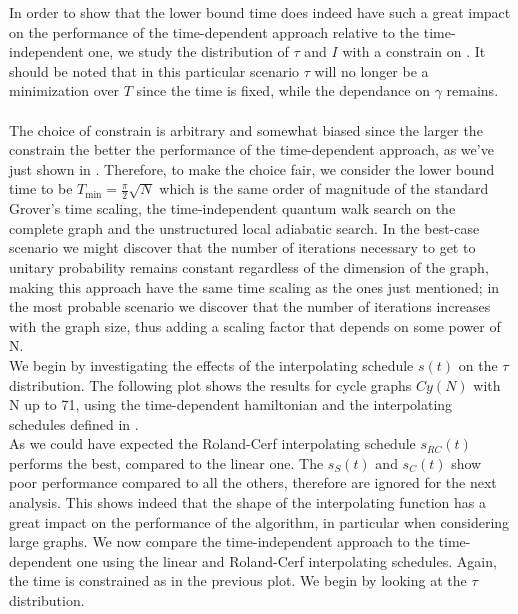         \vspace{0.5cm}
        In order to show that the lower bound time does indeed have such a great impact on the performance of the time-dependent approach relative to the time-independent one, we study the distribution of $\tau$ and $I$ with a constrain on \tmin. It should be noted that in this particular scenario $\tau$ will no longer be a minimization over $T$ since the time is fixed, while the dependance on $\gamma$ remains. \\ \\ The choice of constrain is arbitrary and somewhat biased since the larger the constrain the better the performance of the time-dependent approach, as we've just shown in . Therefore, to make the choice fair, we consider the lower bound time to be $T_{\min} = \frac{\pi}{2}\sqrt{N}$ which is the same order of magnitude of the standard Grover's time scaling, the time-independent quantum walk search on the complete graph and the unstructured local adiabatic search. In the best-case scenario we might discover that the number of iterations necessary to get to unitary probability remains constant regardless of the dimension of the graph, making this approach have the same time scaling as the ones just mentioned; in the most probable scenario we discover that the number of iterations increases with the graph size, thus adding a scaling factor that depends on some power of N. \\

        \noindent
        We begin by investigating the effects of the interpolating schedule $s(t)$ on the $\tau$ distribution. The following plot shows the results for cycle graphs $Cy(N)$ with N up to 71, using the time-dependent hamiltonian and the interpolating schedules defined in .\\
        

        As we could have expected the Roland-Cerf interpolating schedule $s_{RC}(t)$ performs the best, compared to the linear one. The $s_S(t)$ and $s_C(t)$ show poor performance compared to all the others, therefore are ignored for the next analysis.  This shows indeed that the shape of the interpolating function has a great impact on the performance of the algorithm, in particular when considering large graphs. We now compare the time-independent approach to the time-dependent one using the linear and Roland-Cerf interpolating schedules. Again, the time is constrained as in the previous plot. We begin by looking at the $\tau$ distribution. \\
        \clearpage
        

